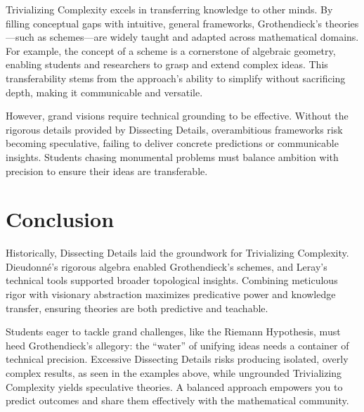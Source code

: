 \documentclass{article}
\begin{document}
Trivializing Complexity excels in transferring knowledge to other minds. By filling conceptual gaps with intuitive, general frameworks, Grothendieck’s theories—such as schemes—are widely taught and adapted across mathematical domains. For example, the concept of a scheme is a cornerstone of algebraic geometry, enabling students and researchers to grasp and extend complex ideas. This transferability stems from the approach’s ability to simplify without sacrificing depth, making it communicable and versatile.

However, grand visions require technical grounding to be effective. Without the rigorous details provided by Dissecting Details, overambitious frameworks risk becoming speculative, failing to deliver concrete predictions or communicable insights. Students chasing monumental problems must balance ambition with precision to ensure their ideas are transferable.

\section{Conclusion}
Historically, Dissecting Details laid the groundwork for Trivializing Complexity. Dieudonné’s rigorous algebra enabled Grothendieck’s schemes, and Leray’s technical tools supported broader topological insights. Combining meticulous rigor with visionary abstraction maximizes predicative power and knowledge transfer, ensuring theories are both predictive and teachable.

Students eager to tackle grand challenges, like the Riemann Hypothesis, must heed Grothendieck’s allegory: the “water” of unifying ideas needs a container of technical precision. Excessive Dissecting Details risks producing isolated, overly complex results, as seen in the examples above, while ungrounded Trivializing Complexity yields speculative theories. A balanced approach empowers you to predict outcomes and share them effectively with the mathematical community.
\end{document}

